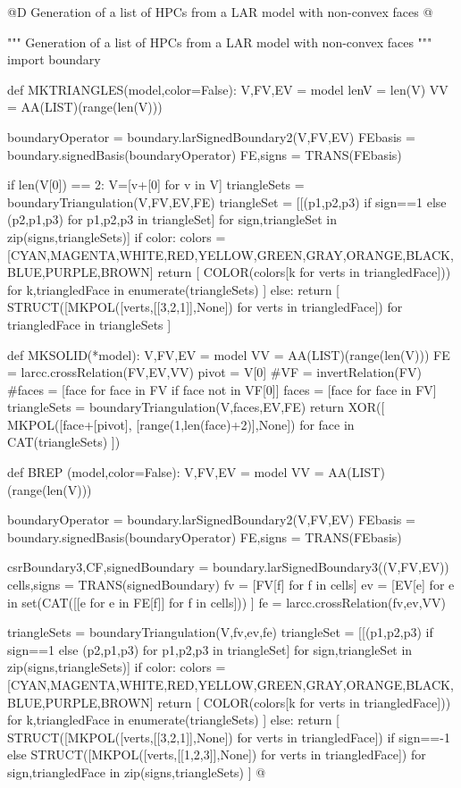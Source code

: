 \documentclass[11pt,oneside]{article}    %
\begin{document}
@D Generation of a list of HPCs from a LAR model with non-convex faces
@{""" Generation of a list of HPCs from a LAR model with non-convex faces """
import boundary

def MKTRIANGLES(model,color=False):
    V,FV,EV = model
    lenV = len(V)
    VV = AA(LIST)(range(len(V)))
    
    boundaryOperator = boundary.larSignedBoundary2(V,FV,EV)
    FEbasis = boundary.signedBasis(boundaryOperator)
    FE,signs = TRANS(FEbasis)
    
    if len(V[0]) == 2: V=[v+[0] for v in V]
    triangleSets = boundaryTriangulation(V,FV,EV,FE)
    triangleSet = [[(p1,p2,p3) if sign==1 else (p2,p1,p3) for p1,p2,p3 in triangleSet] 
                    for sign,triangleSet in zip(signs,triangleSets)]
    if color:
        colors = [CYAN,MAGENTA,WHITE,RED,YELLOW,GREEN,GRAY,ORANGE,BLACK,BLUE,PURPLE,BROWN]
        return [ COLOR(colors[k%
            for verts in triangledFace])) for k,triangledFace in enumerate(triangleSets) ]
    else:
        return [ STRUCT([MKPOL([verts,[[3,2,1]],None]) for verts in triangledFace])
                for triangledFace in triangleSets ]

def MKSOLID(*model): 
    V,FV,EV = model
    VV = AA(LIST)(range(len(V)))
    FE = larcc.crossRelation(FV,EV,VV)
    pivot = V[0]
    #VF = invertRelation(FV) 
    #faces = [face for face in FV if face not in VF[0]]
    faces = [face for face in FV]
    triangleSets = boundaryTriangulation(V,faces,EV,FE)
    return XOR([ MKPOL([face+[pivot], [range(1,len(face)+2)],None])
        for face in CAT(triangleSets) ])
        
def BREP (model,color=False):
    V,FV,EV = model
    VV = AA(LIST)(range(len(V)))
    
    boundaryOperator = boundary.larSignedBoundary2(V,FV,EV)
    FEbasis = boundary.signedBasis(boundaryOperator)
    FE,signs = TRANS(FEbasis)
   
    csrBoundary3,CF,signedBoundary = boundary.larSignedBoundary3((V,FV,EV))
    cells,signs = TRANS(signedBoundary)
    fv = [FV[f] for f in cells]
    ev = [EV[e] for e in set(CAT([[e for e in FE[f]] for f in cells])) ]
    fe = larcc.crossRelation(fv,ev,VV)

    triangleSets = boundaryTriangulation(V,fv,ev,fe) 
    triangleSet = [[(p1,p2,p3) if sign==1 else (p2,p1,p3) for p1,p2,p3 in triangleSet]
                    for sign,triangleSet in zip(signs,triangleSets)]
    if color:
        colors = [CYAN,MAGENTA,WHITE,RED,YELLOW,GREEN,GRAY,ORANGE,BLACK,BLUE,PURPLE,BROWN]
        return [ COLOR(colors[k%
            for verts in triangledFace])) for k,triangledFace in enumerate(triangleSets) ]
    else:
        return [ STRUCT([MKPOL([verts,[[3,2,1]],None])  for verts in triangledFace])
        		 if sign==-1 else 
        		 STRUCT([MKPOL([verts,[[1,2,3]],None])  for verts in triangledFace])
        for sign,triangledFace in zip(signs,triangleSets) ]
@}
\end{document}
